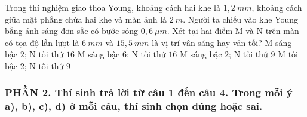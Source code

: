 	\begin{ex}%
		Trong thí nghiệm giao thoa Young, khoảng cách hai khe là $1,2\ mm$, khoảng cách giữa mặt phẳng chứa hai khe và màn ảnh là $2\ m$. Người ta chiếu vào khe Young bằng ánh sáng đơn sắc có bước sóng $ 0,6\ \mu m $. Xét tại hai điểm M và N trên màn có tọa độ lần lượt là $6\ mm$ và $15,5\ mm$ là vị trí vân sáng hay vân tối?
		\choice
		{M sáng bậc $2$; N tối thứ $16$}
		{\True M sáng bậc $6$; N tối thứ $16$}
		{M sáng bậc $2$; N tối thứ $9$}
		{M tối bậc $2$; N tối thứ $9$}
	\end{ex}
	
	

\subsubsection*{PHẦN 2. Thí sinh trả lời từ câu 1 đến câu 4. Trong mỗi ý a), b), c), d) ở mỗi câu, thí sinh chọn đúng hoặc sai.}
\setcounter{ex}{0}

